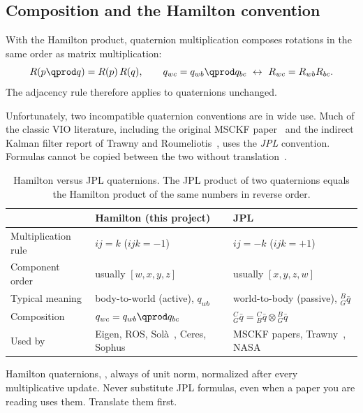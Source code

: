 \subsection{Composition and the Hamilton convention}

With the Hamilton product, quaternion multiplication composes rotations in the same order as matrix
multiplication:
\begin{equation}
  R(p \qprod q) = R(p)\,R(q), \qquad q_{wc} = q_{wb}\qprod q_{bc} \ \leftrightarrow\ R_{wc} = R_{wb}R_{bc}.
\end{equation}
The adjacency rule therefore applies to quaternions unchanged.

Unfortunately, two incompatible quaternion conventions are in wide use. Much of the classic VIO
literature, including the original MSCKF paper~\cite{mourikis2007msckf} and the indirect Kalman filter
report of Trawny and Roumeliotis~\cite{trawny2005indirect}, uses the \emph{JPL} convention. Formulas
cannot be copied between the two without translation~\cite{sommer2018flipped}.

\begin{table}[h]
\centering\small
\begin{tabularx}{\textwidth}{@{}l X X@{}}
\toprule
 & \textbf{Hamilton (this project)} & \textbf{JPL} \\
\midrule
Multiplication rule & $ij = k$ ($ijk = -1$) & $ij = -k$ ($ijk = +1$) \\
Component order & usually $[w, x, y, z]$ & usually $[x, y, z, w]$ \\
Typical meaning & body-to-world (active), $q_{wb}$ & world-to-body (passive), ${}^{B}_{G}\bar q$ \\
Composition & $q_{wc} = q_{wb}\qprod q_{bc}$ & ${}^{C}_{G}\bar q = {}^{C}_{B}\bar q\otimes{}^{B}_{G}\bar q$ \\
Used by & Eigen, ROS, Solà~\cite{sola2017quaternion}, Ceres, Sophus & MSCKF papers, Trawny~\cite{trawny2005indirect}, NASA \\
\bottomrule
\end{tabularx}
\caption{Hamilton versus JPL quaternions. The JPL product of two quaternions equals the Hamilton
product of the same numbers in reverse order.}
\label{tab:hamilton-jpl}
\end{table}

\begin{convention}
Hamilton quaternions, , always of unit norm, normalized after every
multiplicative update. Never substitute JPL formulas, even when a paper you are reading uses them.
Translate them first.
\end{convention}

